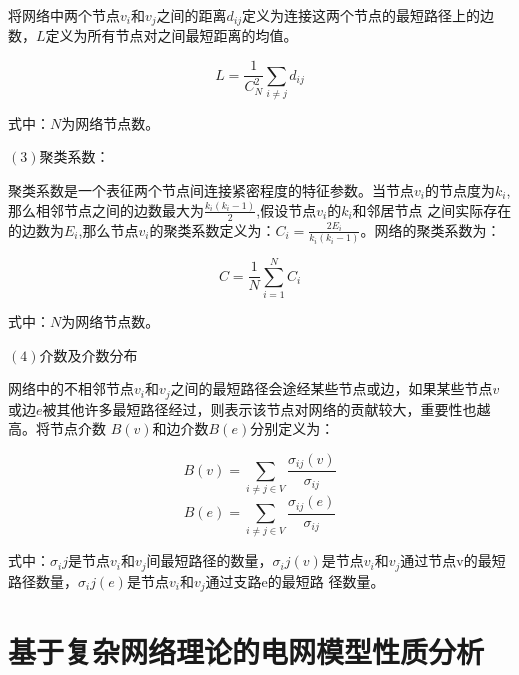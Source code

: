 将网络中两个节点$v_i$和$v_j$之间的距离$d_{ij}$定义为连接这两个节点的最短路径上的边数，$L$定义为所有节点对之间最短距离的均值。

\begin{equation}
    \label{equ:chap3:feature}
    L=\frac{1}{C_N^2} \sum_{i \neq j} d_{i j}
\end{equation}

式中：$N$为网络节点数。

$(3)$聚类系数：

聚类系数是一个表征两个节点间连接紧密程度的特征参数。当节点$v_i$的节点度为$k_i$,那么相邻节点之间的边数最大为$\frac{k_i(k_i-1)}{2}$,假设节点$v_i$的$k_i$和邻居节点
之间实际存在的边数为$E_i$,那么节点$v_i$的聚类系数定义为：$C_i=\frac{2E_i}{k_i(k_i-1)}$。网络的聚类系数为：

\begin{equation} 
    \label{equ:chap3:feature}
    C=\frac{1}{N} \sum_{i=1}^N C_i
\end{equation}

式中：$N$为网络节点数。

$(4)$介数及介数分布

网络中的不相邻节点$v_i$和$v_j$之间的最短路径会途经某些节点或边，如果某些节点$v$或边$e$被其他许多最短路径经过，则表示该节点对网络的贡献较大，重要性也越高。将节点介数
$B(v)$和边介数$B(e)$分别定义为：

\begin{equation} 
    \label{equ:chap3:feature}
    B(v)=\sum_{i \neq j\in V} \frac{\sigma_{ij}(v)}{\sigma_{ij}} 
\end{equation}
\begin{equation} 
    \label{equ:chap3:feature}
    B(e)=\sum_{i \neq j\in V} \frac{\sigma_{ij}(e)}{\sigma_{ij}} 
\end{equation}

式中：$\sigma_ij$是节点$v_i$和$v_j$间最短路径的数量，$\sigma_ij(v)$是节点$v_i$和$v_j$通过节点v的最短路径数量，$\sigma_ij(e)$是节点$v_i$和$v_j$通过支路e的最短路
径数量。

\section{基于复杂网络理论的电网模型性质分析}
\label{sec:complexGrid}

